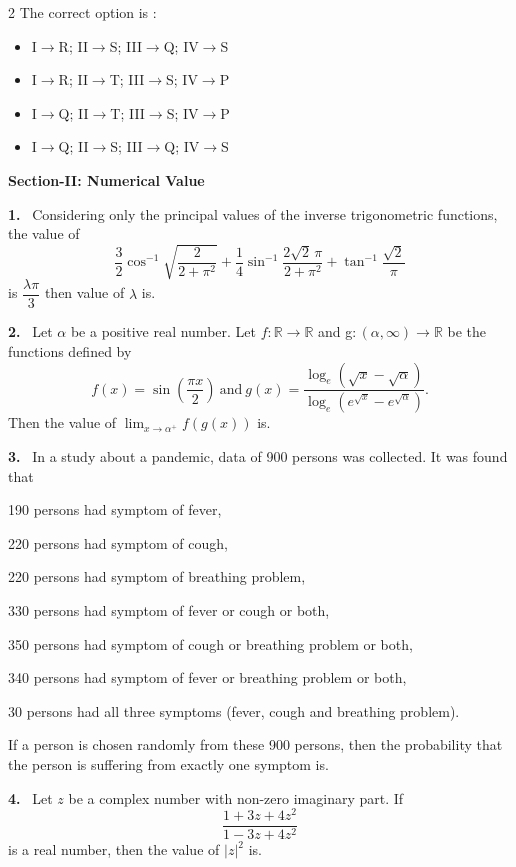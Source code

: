 \documentclass[10pt]{extarticle}
\newcommand{\sect}[1]{\par\smallskip\noindent\textbf{#1}\par}
\newcommand{\qn}[1]{\par\smallskip\noindent\textbf{#1.}~}
\newenvironment{qoptions}{\begin{itemize}[leftmargin=1.8em,itemsep=1pt,topsep=2pt,label={}]}{\end{itemize}}
\newcommand{\opt}[2]{\item[(#1)] #2}
\begin{document}
\begin{multicols}{2}
The correct option is :
\begin{qoptions}
\opt{A}{I$\to$R; II$\to$S; III$\to$Q; IV$\to$S}
\opt{B}{I$\to$R; II$\to$T; III$\to$S; IV$\to$P}
\opt{C}{I$\to$Q; II$\to$T; III$\to$S; IV$\to$P}
\opt{D}{I$\to$Q; II$\to$S; III$\to$Q; IV$\to$S}
\end{qoptions}

\sect{Section-II: Numerical Value}

\qn{1} Considering only the principal values of the inverse trigonometric functions, the value of
\[\dfrac32\cos^{-1}\sqrt{\dfrac{2}{2+\pi^2}} + \dfrac14\sin^{-1}\dfrac{2\sqrt2\,\pi}{2+\pi^2} + \tan^{-1}\dfrac{\sqrt2}{\pi}\]
is $\dfrac{\lambda\pi}{3}$ then value of $\lambda$ is\underline{\hspace{2em}}.

\qn{2} Let $\alpha$ be a positive real number. Let $f:\mathbb R\to\mathbb R$ and g$:(\alpha,\infty)\to\mathbb R$ be the functions defined by
\[f(x) = \sin\left(\dfrac{\pi x}{2}\right)\ \text{and}\ g(x) = \dfrac{\log_e\left(\sqrt x-\sqrt\alpha\right)}{\log_e\left(e^{\sqrt x}-e^{\sqrt\alpha}\right)}.\]
Then the value of $\displaystyle\lim_{x\to\alpha^+} f(g(x))$ is\underline{\hspace{2em}}.

\qn{3} In a study about a pandemic, data of 900 persons was collected. It was found that

190 persons had symptom of fever,

220 persons had symptom of cough,

220 persons had symptom of breathing problem,

330 persons had symptom of fever or cough or both,

350 persons had symptom of cough or breathing problem or both,

340 persons had symptom of fever or breathing problem or both,

30 persons had all three symptoms (fever, cough and breathing problem).

If a person is chosen randomly from these 900 persons, then the probability that the person is suffering from exactly one symptom is\underline{\hspace{2em}}.

\qn{4} Let $z$ be a complex number with non-zero imaginary part. If
\[\dfrac{1+3z+4z^2}{1-3z+4z^2}\]
is a real number, then the value of $|z|^2$ is\underline{\hspace{2em}}.


\end{multicols}
\end{document}
